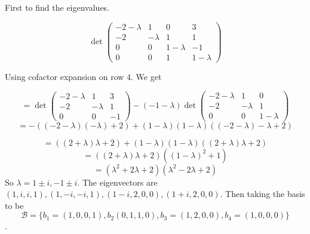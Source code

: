 \documentclass[letter,12pt]{article}
\begin{document}
First to find the eigenvalues. 

\[
\det\begin{pmatrix}
    -2-\lambda & 1 & 0 & 3\\
    -2 & -\lambda & 1 & 1\\
    0 & 0 & 1-\lambda & -1\\
    0 & 0 & 1 & 1-\lambda
\end{pmatrix}    
\]

Using  cofactor expansion on row $4$. We get 

$$
=\det\begin{pmatrix}
    -2-\lambda & 1 & 3\\
    -2 & -\lambda & 1\\
    0 & 0 & -1
\end{pmatrix}
-(-1-\lambda)\det\begin{pmatrix}
    -2-\lambda & 1 & 0\\
    -2 & -\lambda & 1\\
    0 & 0 & 1-\lambda
\end{pmatrix}$$
$$= -((-2-\lambda)(-\lambda)+2)+(1-\lambda)(1-\lambda)((-2-\lambda)-\lambda+2)$$

$$=((2+\lambda)\lambda +2)+(1-\lambda)(1-\lambda)((2+\lambda)\lambda+2)$$
$$=((2+\lambda)\lambda+2)((1-\lambda)^2+1)$$
$$=(\lambda^2+2\lambda+2)(\lambda^2-2\lambda+2)$$
So $\lambda=1\pm i,-1\pm i$. The eigenvectors are $(1,i,i,1),(1,-i,-i,1),(1-i,2,0,0),(1+i,2,0,0)$. Then taking the basis to be $$\mathcal B=\{b_1=(1,0,0,1),b_2(0,1,1,0),b_3=(1,2,0,0),b_4=(1,0,0,0)\}$$.
\end{document}
